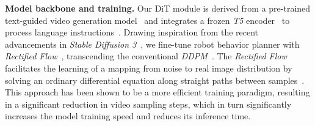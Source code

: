 \textbf{Model backbone and training.}
Our DiT module is derived from a pre-trained text-guided video generation model~\citep{opensora} and integrates a frozen \textit{T5} encoder~\citep{2020t5} to process language instructions~\citep{2020t5}.
Drawing inspiration from the recent advancements in \textit{Stable Diffusion 3}~\citep{esser2024scaling}, we fine-tune robot behavior planner with \textit{Rectified Flow}~\citep{liu2022flow}, transcending the conventional \textit{DDPM}~\citep{ddpm}.
The \textit{Rectified Flow} facilitates the learning of a mapping from noise to real image distribution by solving an ordinary differential equation along straight paths between samples~\citep{liu2022flow}. 
This approach has been shown to be a more efficient training paradigm, resulting in a significant reduction in video sampling steps, which in turn significantly increases the model training speed and reduces its inference time.

